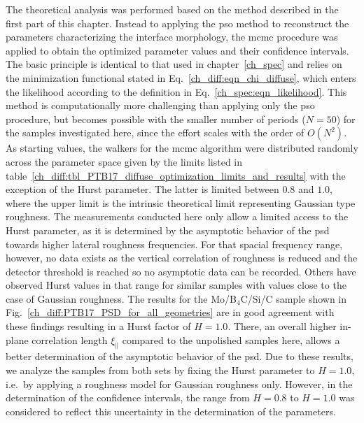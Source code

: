 The theoretical analysis was performed based on the method described in the first part of this chapter. Instead to applying the \gls{pso} method to reconstruct the parameters characterizing the interface morphology, the \gls{mcmc} procedure was applied to obtain the optimized parameter values and their confidence intervals. The basic principle is identical to that used in chapter~\ref{ch_spec} and relies on the minimization functional stated in Eq.~\eqref{ch_diff:eqn_chi_diffuse}, which enters the likelihood according to the definition in Eq.~\eqref{ch_spec:eqn_likelihood}. This method is computationally more challenging than applying only the \gls{pso} procedure, but becomes possible with the smaller number of periods ($N=50$) for the samples investigated here, since the effort scales with the order of $O(N^2)$. As starting values, the walkers for the \gls{mcmc} algorithm were distributed randomly across the parameter space given by the limits listed in table~\ref{ch_diff:tbl_PTB17_diffuse_optimization_limits_and_results} with the exception of the Hurst parameter. The latter is limited between $0.8$ and $1.0$, where the upper limit is the intrinsic theoretical limit representing Gaussian type roughness. The measurements conducted here only allow a limited access to the Hurst parameter, as it is determined by the asymptotic behavior of the \gls{psd} towards higher lateral roughness frequencies. For that spacial frequency range, however, no data exists as the vertical correlation of roughness is reduced and the detector threshold is reached so no asymptotic data can be recorded. Others \cite{rack_comparative_2010} have observed Hurst values in that range for similar samples with values close to the case of Gaussian roughness. The results for the Mo/B$_4$C/Si/C sample shown in Fig.~\ref{ch_diff:PTB17_PSD_for_all_geometries} are in good agreement with these findings resulting in a Hurst factor of $H=1.0$. There, an overall higher in-plane correlation length $\xi_\parallel$ compared to the unpolished samples here, allows a better determination of the asymptotic behavior of the \gls{psd}. Due to these results, we analyze the samples from both sets by fixing the Hurst parameter to $H=1.0$, i.e.~by applying a roughness model for Gaussian roughness only. However, in the determination of the confidence intervals, the range from $H=0.8$ to $H=1.0$ was considered to reflect this uncertainty in the determination of the parameters. 

